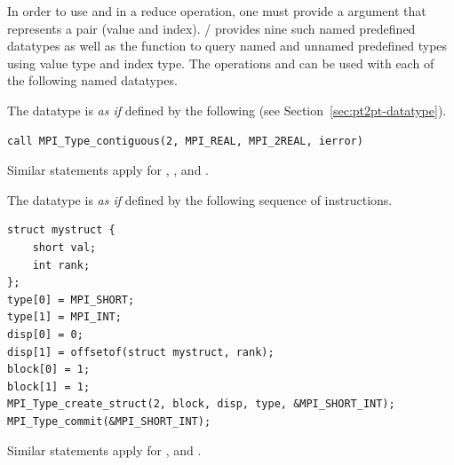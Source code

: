 In order to use  and  in a
reduce operation, one must provide a  argument
that represents a pair (value and index).  \MPI/ provides
nine
such named predefined datatypes as well as the function  to query named and unnamed predefined types using value type and index type.  The operations  and
 can be used with each of the following named datatypes.
\begin{constlist}
\end{constlist}
\begin{constlist}%
\end{constlist}

The datatype  is \emph{as if} defined by the following
(see Section~\ref{sec:pt2pt-datatype}).

\begin{lstlisting}[language={[MPI]Fortran}]
call MPI_Type_contiguous(2, MPI_REAL, MPI_2REAL, ierror)
\end{lstlisting}

Similar statements apply for ,
, and .

The datatype  is \emph{as if} defined by the
following sequence of instructions.
\begin{lstlisting}[language={[MPI]C}]
struct mystruct {
    short val;
    int rank;
};
type[0] = MPI_SHORT;
type[1] = MPI_INT;
disp[0] = 0;
disp[1] = offsetof(struct mystruct, rank);
block[0] = 1;
block[1] = 1;
MPI_Type_create_struct(2, block, disp, type, &MPI_SHORT_INT);
MPI_Type_commit(&MPI_SHORT_INT);
\end{lstlisting}
Similar statements apply for , 
and .


